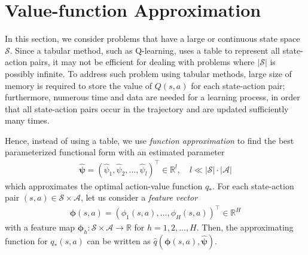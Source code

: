 \section{Value-function Approximation}
\label{sec: value function approximation}
In this section, we consider problems that have a large or continuous state space $\mathcal{S}$. Since a tabular method, such as Q-learning, uses a table to represent all state-action pairs, it may not be efficient for dealing with problems where $|\mathcal{S}|$ is possibly infinite. To address such problem using tabular methods, large size of memory is required to store the value of $Q(s,a)$ for each state-action pair; furthermore, numerous time and data are needed for a learning process, in order that all state-action pairs occur in the trajectory and are updated sufficiently many times.

Hence, instead of using a table, we use \textit{function approximation} to find the best parameterized functional form with an estimated parameter
\begin{align*}
    \widehat{\boldsymbol{\psi}} = (\hat{\psi}_1, \hat{\psi}_2, \dots, \hat{\psi}_l)^\top\in\mathbb{R}^{l}, \quad l \ll |\mathcal{S}|\cdot|\mathcal{A}|
\end{align*} which approximates the optimal action-value function $q_\ast$. For each state-action pair $(s,a)\in\mathcal{S}\times\mathcal{A}$, let us consider a \textit{feature vector}
\begin{align*}
    \boldsymbol{\phi}(s,a) = (\phi_1(s,a), \dots, \phi_H(s,a))^\top \in \mathbb{R}^H
\end{align*}
with a feature map $\boldsymbol{\phi}_h:\mathcal{S} \times \mathcal{A} \rightarrow \mathbb{R}$ for $h = 1, 2, \dots, H$. Then, the approximating function for $q_\ast(s,a)$ can be written as $\hat{q}(\boldsymbol{\phi}(s,a), \widehat{\boldsymbol{\psi}})$.

